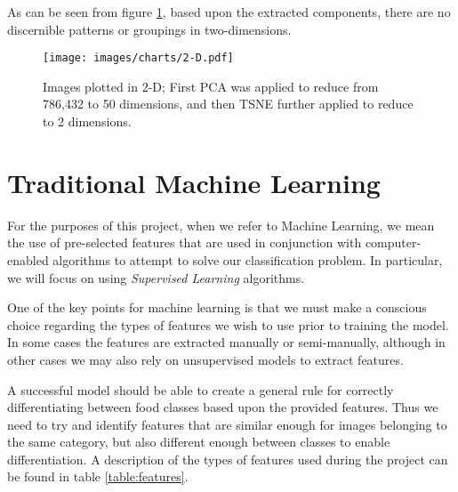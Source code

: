 \documentclass[10pt,a4paper]{article}
\begin{document}
As can be seen from figure \ref{fig:2-d}, based upon the extracted components, there are no discernible patterns or groupings in two-dimensions.

\begin{figure}[h]
\begin{framed}
\hspace*{-0.5cm}
\caption{Images plotted in 2-D; First PCA was applied to reduce from 786,432 to 50 dimensions, and then TSNE further applied to reduce to 2 dimensions.}
  \texttt{[image: images/charts/2-D.pdf]}
  \label{fig:2-d}
\end{framed} 
\end{figure}

\section{Traditional Machine Learning}

For the purposes of this project, when we refer to Machine Learning, we mean the use of pre-selected features that are used in conjunction with computer-enabled algorithms to attempt to solve our classification problem. In particular, we will focus on using \emph{Supervised Learning} algorithms.

One of the key points for machine learning is that we must make a conscious choice regarding the types of features we wish to use prior to training the model. In some cases the features are extracted manually or semi-manually, although in other cases we may also rely on unsupervised models to extract features.

A successful model should be able to create a general rule for correctly differentiating between food classes based upon the provided features. Thus we need to try and identify features that are similar enough for images belonging to the same category, but also different enough between classes to enable differentiation. A description of the types of features used during the project can be found in table \ref{table:features}.
\end{document}
